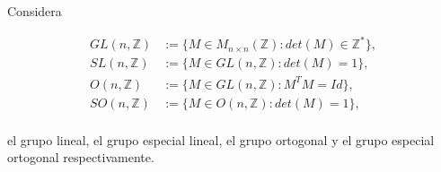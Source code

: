 \question Considera 

\begin{align*}
GL(n,\mathbb{Z}) &:= \{M \in M_{n\times n}(\mathbb{Z}): det(M)\in\mathbb{Z}^*\}, \\
SL(n,\mathbb{Z}) &:= \{M \in GL(n,\mathbb{Z}): det(M)=1\}, \\
O(n,\mathbb{Z}) &:= \{M \in GL(n,\mathbb{Z}): M^TM=Id\}, \\
SO(n,\mathbb{Z}) &:= \{M \in O(n,\mathbb{Z}): det(M)=1\}, \\
\end{align*}

el grupo lineal, el grupo especial lineal, el grupo ortogonal y el grupo especial ortogonal respectivamente.

